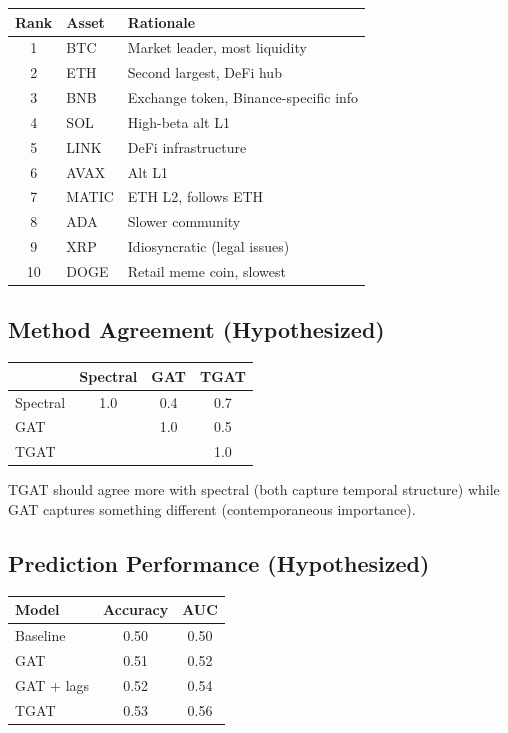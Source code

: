 \documentclass[11pt, a4paper]{article}
\begin{document}
\begin{center}
\begin{tabular}{cll}
\toprule
\textbf{Rank} & \textbf{Asset} & \textbf{Rationale} \\
\midrule
1 & BTC & Market leader, most liquidity \\
2 & ETH & Second largest, DeFi hub \\
3 & BNB & Exchange token, Binance-specific info \\
4 & SOL & High-beta alt L1 \\
5 & LINK & DeFi infrastructure \\
6 & AVAX & Alt L1 \\
7 & MATIC & ETH L2, follows ETH \\
8 & ADA & Slower community \\
9 & XRP & Idiosyncratic (legal issues) \\
10 & DOGE & Retail meme coin, slowest \\
\bottomrule
\end{tabular}
\end{center}

\subsection{Method Agreement (Hypothesized)}

\begin{center}
\begin{tabular}{lccc}
\toprule
& \textbf{Spectral} & \textbf{GAT} & \textbf{TGAT} \\
\midrule
Spectral & 1.0 & 0.4 & 0.7 \\
GAT & & 1.0 & 0.5 \\
TGAT & & & 1.0 \\
\bottomrule
\end{tabular}
\end{center}

TGAT should agree more with spectral (both capture temporal structure) while GAT captures something different (contemporaneous importance).

\subsection{Prediction Performance (Hypothesized)}

\begin{center}
\begin{tabular}{lcc}
\toprule
\textbf{Model} & \textbf{Accuracy} & \textbf{AUC} \\
\midrule
Baseline & 0.50 & 0.50 \\
GAT & 0.51 & 0.52 \\
GAT + lags & 0.52 & 0.54 \\
TGAT & 0.53 & 0.56 \\
\bottomrule
\end{tabular}
\end{center}
\end{document}
